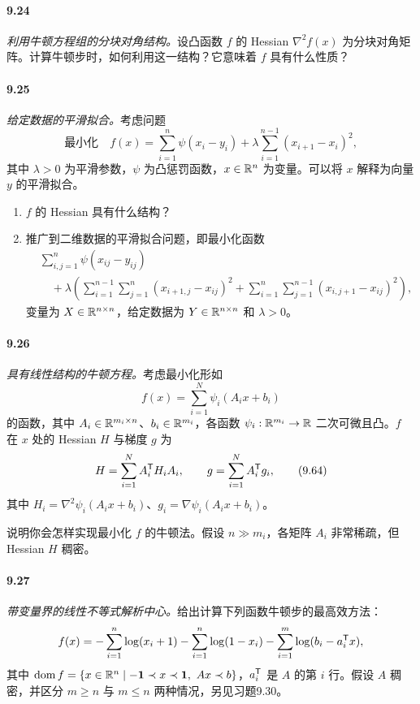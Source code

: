 \paragraph{9.24} \emph{利用牛顿方程组的分块对角结构。}设凸函数 $f$ 的 Hessian $\nabla^2f(x)$ 为分块对角矩阵。计算牛顿步时，如何利用这一结构？它意味着 $f$ 具有什么性质？

\paragraph{9.25} \emph{给定数据的平滑拟合。}考虑问题
\[
 \text{最小化}\quad f(x)=\sum_{i=1}^n\psi(x_i-y_i)+\lambda\sum_{i=1}^{n-1}(x_{i+1}-x_i)^2,
\]
其中 $\lambda>0$ 为平滑参数，$\psi$ 为凸惩罚函数，$x\in\mathbb R^n$ 为变量。可以将 $x$ 解释为向量 $y$ 的平滑拟合。
\begin{enumerate}[label=(\alph*)]
\item $f$ 的 Hessian 具有什么结构？
\item 推广到二维数据的平滑拟合问题，即最小化函数
\[
\begin{aligned}
 &\sum_{i,j=1}^n\psi(x_{ij}-y_{ij})\\
 &\quad+\lambda\left(\sum_{i=1}^{n-1}\sum_{j=1}^n(x_{i+1,j}-x_{ij})^2
 +\sum_{i=1}^n\sum_{j=1}^{n-1}(x_{i,j+1}-x_{ij})^2\right),
\end{aligned}
\]
变量为 $X\in\mathbb R^{n\times n}$，给定数据为 $Y\in\mathbb R^{n\times n}$ 和 $\lambda>0$。
\end{enumerate}

\paragraph{9.26} \emph{具有线性结构的牛顿方程。}考虑最小化形如
\begin{equation}
 f(x)=\sum_{i=1}^N\psi_i(A_ix+b_i)\tag{9.63}
\end{equation}
的函数，其中 $A_i\in\mathbb R^{m_i\times n}$、$b_i\in\mathbb R^{m_i}$，各函数 $\psi_i:\mathbb R^{m_i}\to\mathbb R$ 二次可微且凸。$f$ 在 $x$ 处的 Hessian $H$ 与梯度 $g$ 为
\begin{equation}
 H=\sum_{i=1}^N A_i^\mathsf T H_iA_i,\qquad
 g=\sum_{i=1}^N A_i^\mathsf T g_i,\tag{9.64}
\end{equation}
其中 $H_i=\nabla^2\psi_i(A_ix+b_i)$、$g_i=\nabla\psi_i(A_ix+b_i)$。

说明你会怎样实现最小化 $f$ 的牛顿法。假设 $n\gg m_i$，各矩阵 $A_i$ 非常稀疏，但 Hessian $H$ 稠密。

\paragraph{9.27} \emph{带变量界的线性不等式解析中心。}给出计算下列函数牛顿步的最高效方法：
\[
 f(x)=-\sum_{i=1}^n\log(x_i+1)-\sum_{i=1}^n\log(1-x_i)
 -\sum_{i=1}^m\log(b_i-a_i^\mathsf T x),
\]
其中 $\dom f=\{x\in\R^n\mid-\one\prec x\prec\one,\ Ax\prec b\}$，$a_i^\mathsf T$ 是 $A$ 的第 $i$ 行。假设 $A$ 稠密，并区分 $m\ge n$ 与 $m\le n$ 两种情况，另见习题9.30。

